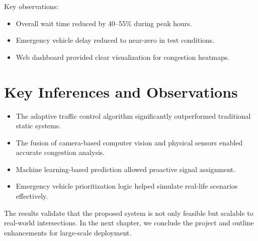 Key observations:
\begin{itemize}
    \item Overall wait time reduced by 40--55\% during peak hours.
    \item Emergency vehicle delay reduced to near-zero in test conditions.
    \item Web dashboard provided clear visualization for congestion heatmaps.
\end{itemize}

\section{Key Inferences and Observations}

\begin{itemize}
    \item The adaptive traffic control algorithm significantly outperformed traditional static systems.
    \item The fusion of camera-based computer vision and physical sensors enabled accurate congestion analysis.
    \item Machine learning-based prediction allowed proactive signal assignment.
    \item Emergency vehicle prioritization logic helped simulate real-life scenarios effectively.
\end{itemize}

\vspace{0.5cm}

The results validate that the proposed system is not only feasible but scalable to real-world intersections. In the next chapter, we conclude the project and outline enhancements for large-scale deployment.